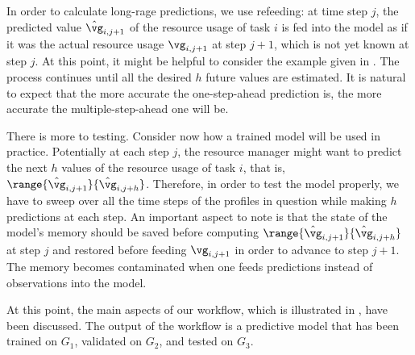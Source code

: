 In order to calculate long-rage predictions, we use refeeding: at time step $j$,
the predicted value $\hat{\vg}_{i,j + 1}$ of the resource usage of task $i$ is
fed into the model as if it was the actual resource usage $\vg_{i,j + 1}$ at
step $j + 1$, which is not yet known at step $j$. At this point, it might be
helpful to consider the example given in . The process
continues until all the desired $h$ future values are estimated. It is natural
to expect that the more accurate the one-step-ahead prediction is, the more
accurate the multiple-step-ahead one will be.

There is more to testing. Consider now how a trained model will be used in
practice. Potentially at each step $j$, the resource manager might want to
predict the next $h$ values of the resource usage of task $i$, that is,
$\range{\hat{\vg}_{i,j + 1}}{\hat{\vg}_{i,j + h}}$. Therefore, in order to test
the model properly, we have to sweep over all the time steps of the profiles in
question while making $h$ predictions at each step. An important aspect to note
is that the state of the model's memory should be saved before computing
$\range{\hat{\vg}_{i,j + 1}}{\hat{\vg}_{i,j + h}}$ at step $j$ and restored
before feeding $\vg_{i,j + 1}$ in order to advance to step $j + 1$. The memory
becomes contaminated when one feeds predictions instead of observations into the
model.

At this point, the main aspects of our workflow, which is illustrated in
, have been discussed. The output of the workflow is a predictive
model that has been trained on $G_1$, validated on $G_2$, and tested on $G_3$.
